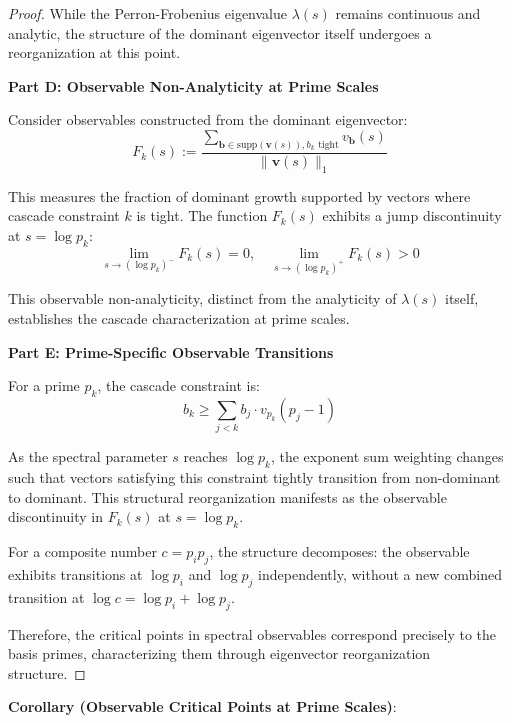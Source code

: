 \begin{proof}
While the Perron-Frobenius eigenvalue $\lambda(s)$ remains continuous and analytic, the structure of the dominant eigenvector itself undergoes a reorganization at this point.

\noindent \textbf{Part D: Observable Non-Analyticity at Prime Scales}

Consider observables constructed from the dominant eigenvector:
\begin{equation}
F_k(s) := \frac{\sum_{\mathbf{b} \in \text{supp}(\mathbf{v}(s)), b_k \text{ tight}} v_{\mathbf{b}}(s)}{\|\mathbf{v}(s)\|_1}
\end{equation}

This measures the fraction of dominant growth supported by vectors where cascade constraint $k$ is tight. The function $F_k(s)$ exhibits a jump discontinuity at $s = \log p_k$:
\begin{equation}
\lim_{s \to (\log p_k)^-} F_k(s) = 0, \quad \lim_{s \to (\log p_k)^+} F_k(s) > 0
\end{equation}

This observable non-analyticity, distinct from the analyticity of $\lambda(s)$ itself, establishes the cascade characterization at prime scales.

\noindent \textbf{Part E: Prime-Specific Observable Transitions}

For a prime $p_k$, the cascade constraint is:
\begin{equation}
b_k \geq \sum_{j < k} b_j \cdot v_{p_k}(p_j - 1)
\end{equation}

As the spectral parameter $s$ reaches $\log p_k$, the exponent sum weighting changes such that vectors satisfying this constraint tightly transition from non-dominant to dominant. This structural reorganization manifests as the observable discontinuity in $F_k(s)$ at $s = \log p_k$.

For a composite number $c = p_i p_j$, the structure decomposes: the observable exhibits transitions at $\log p_i$ and $\log p_j$ independently, without a new combined transition at $\log c = \log p_i + \log p_j$.

Therefore, the critical points in spectral observables correspond precisely to the basis primes, characterizing them through eigenvector reorganization structure.

\end{proof}

\noindent \textbf{Corollary (Observable Critical Points at Prime Scales)}:

